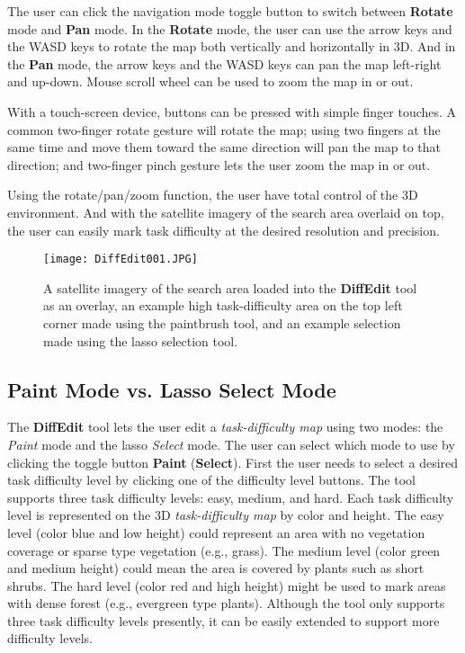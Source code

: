 The user can click the navigation mode toggle button to switch between \textbf{Rotate} mode and \textbf{Pan} mode. In the \textbf{Rotate} mode, the user can use the arrow keys and the WASD keys to rotate the map both vertically and horizontally in 3D. And in the \textbf{Pan} mode, the arrow keys and the WASD keys can pan the map left-right and up-down. Mouse scroll wheel can be used to zoom the map in or out.

With a touch-screen device, buttons can be pressed with simple finger touches. A common two-finger rotate gesture will rotate the map; using two fingers at the same time and move them toward the same direction will pan the map to that direction; and two-finger pinch gesture lets the user zoom the map in or out.

Using the rotate/pan/zoom function, the user have total control of the 3D environment. And with the satellite imagery of the search area overlaid on top, the user can easily mark task difficulty at the desired resolution and precision.

\begin{figure}
\centering
\texttt{[image: DiffEdit001.JPG]}
\caption{A satellite imagery of the search area loaded into the \textbf{DiffEdit} tool as an overlay, an example high task-difficulty area on the top left corner made using the paintbrush tool, and an example selection made using the lasso selection tool.}
\label{DiffEdit001}
\end{figure}


\subsection{Paint Mode vs. Lasso Select Mode}

The \textbf{DiffEdit} tool lets the user edit a \textit{task-difficulty map} using two modes: the \textit{Paint} mode and the lasso \textit{Select} mode. The user can select which mode to use by clicking the toggle button \textbf{Paint} (\textbf{Select}). First the user needs to select a desired task difficulty level by clicking one of the difficulty level buttons. The tool supports three task difficulty levels: easy, medium, and hard. Each task difficulty level is represented on the 3D \textit{task-difficulty map} by color and height. The easy level (color blue and low height) could represent an area with no vegetation coverage or sparse type vegetation (e.g., grass). The medium level (color green and medium height) could mean the area is covered by plants such as short shrubs. The hard level (color red and high height) might be used to mark areas with dense forest (e.g., evergreen type plants). Although the tool only supports three task difficulty levels presently, it can be easily extended to support more difficulty levels.

